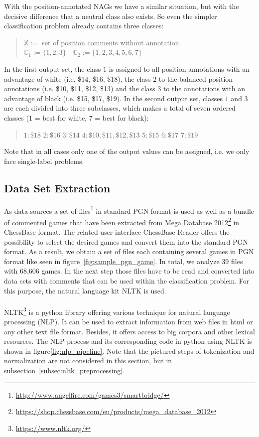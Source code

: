 \documentclass[article,type=msc,colorback,accentcolor=tud7b]{tudthesis}
\begin{document}
\begin{itemize}
      With the position-annotated NAGs we have a similar situation, but with the decisive difference that a neutral class also exists. So even the simpler classification problem already contains three classes:
      \begin{quotation}
        $\mathbb{X}:=$ set of position comments without annotation \quad $\mathbb{C}_{1}:=\{1,2,3\} \quad \mathbb{C}_{2}:=\{1,2,3,4,5,6,7\}$
      \end{quotation}
      In the first output set, the class $1$ is assigned to all position annotations with an advantage of white (i.e. \$14, \$16, \$18), the class $2$ to the balanced position annotations (i.e. \$10, \$11, \$12, \$13) and the class $3$ to the annotations with an advantage of black (i.e. \$15, \$17, \$19). In the second output set, classes $1$ and $3$ are each divided into three subclasses, which makes a total of seven ordered classes (1 = best for white, 7 = best for black):
      \begin{quotation}
        $1: \$18$ \quad $2: \$16$ \quad $3: \$14$ \quad $4: \$10,\$11,\$12,\$13$ \quad $5: \$15$ \quad $6: \$17$ \quad $7: \$19$
      \end{quotation}
    \end{itemize}
    Note that in all cases only one of the output values can be assigned, i.e. we only face single-label problems.
  
  \subsection{Data Set Extraction}
  \label{subsec:data_set_extraction}  
    As data sources a set of files\footnote{\url{http://www.angelfire.com/games3/smartbridge/}} in standard PGN format is used as well as a bundle of commented games that have been extracted from Mega Database 2012\footnote{\url{https://shop.chessbase.com/en/products/mega_database_2012}} in ChessBase format. The related user interface ChessBase Reader offers the possibility to select the desired games and convert them into the standard PGN format. As a result, we obtain a set of files each containing several games in PGN format like seen in figure~\ref{fig:sample_pgn_game}. In total, we analyze 39 files with 68,606 games. In the next step those files have to be read and converted into data sets with comments that can be used within the classification problem. For this purpose, the natural language kit NLTK is used. \\\\
    NLTK\footnote{\url{https://www.nltk.org/}} is a python library offering various technique for natural language processing (NLP). It can be used to extract information from web files in html or any other text file format. Besides, it offers access to big corpora and other lexical resources. The NLP process and its corresponding code in python using NLTK is shown in figure\ref{fig:nlp_pipeline}. Note that the pictured steps of tokenization and normalization are not considered in this section, but in subsection~\ref{subsec:nltk_preprocessing}.
\end{document}
